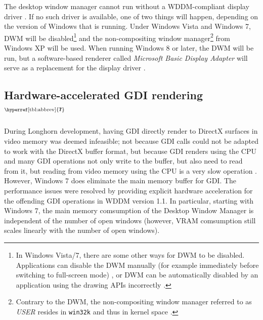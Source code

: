 \documentclass[10pt,twocolumn,a4paper,os=win]{article}
\newcommand{\bs}[1]{\textbf{\sffamily #1}}
\newcommand{\winver}[1]{$^{\text{\hyperref[tbl:abbrev]{\bs{#1}}}}$}
\newcommand{\winsubsection}[2]{\subsection[#1]{#1\winver{#2}}}
\begin{document}
			The desktop window manager cannot run without a WDDM-compliant
			display driver \cite{dwmwddm}. If no such driver is available, one
			of two things will happen, depending on the version of Windows that
			is running. Under Windows Vista and Windows 7, DWM will be
			disabled\footnote{In Windows Vista/7, there are some other ways for
			DWM to be disabled. Applications can disable the DWM manually (for
			example immediately before switching to full-screen mode)
			\cite{disabledwm}, or DWM can be automatically disabled by an
			application using the drawing APIs incorrectly \cite{dwmredirect}.}
			and the non-compositing window manager\footnote{Contrary to the DWM,
			the non-compositing window manager referred to as \textit{USER} resides
			in \texttt{win32k} and thus in kernel space \cite{probertwin32k}.}
			from Windows XP will be used. When running Windows 8 or later,
			the DWM will be run, but a software-based renderer called
			\textit{Microsoft Basic Display Adapter} will serve as a replacement
			for the display driver \cite{dwmalwayson}.


		\winsubsection{Hardware-accelerated GDI ren\-der\-ing}{7}
			During Longhorn development, having GDI directly render to DirectX
			surfaces in video memory was deemed infeasible; not because GDI calls
			could not be adapted to work with the DirectX buffer format, but because
			GDI renders using the CPU and many GDI operations not only write to
			the buffer, but also need to read from it, but reading from video memory
			using the CPU is a very slow operation \cite{dwmredirect}. However,
			Windows 7 does eliminate the main memory buffer for GDI. The performance
			issues were resolved by providing explicit hardware acceleration for
			the offending GDI operations in WDDM version 1.1. In particular,
			starting with Windows 7, the
			main memory comsumption of the Desktop Window Manager is independent
			of the number of open windows (however, VRAM comsumption still scales
			linearly with the number of open windows).
			\cite{win7}

	\onecolumn{\printbibliography}
\end{document}
